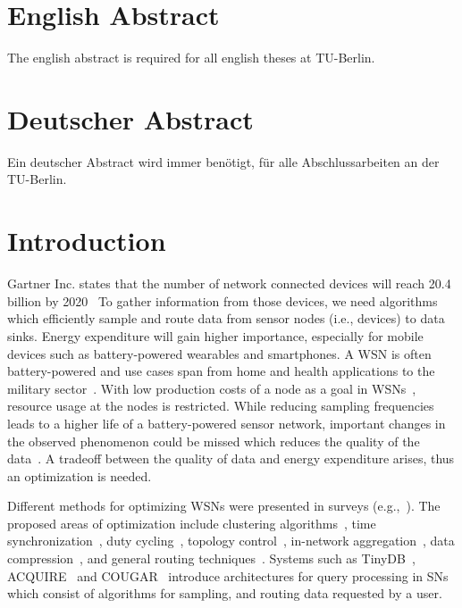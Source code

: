 
\section*{English Abstract}
\begin{onehalfspace}
	
	The english abstract is required for all english theses at TU-Berlin.
\end{onehalfspace}
\clearpage

\section*{Deutscher Abstract}
\begin{onehalfspace}
	
	Ein deutscher Abstract wird immer benötigt, für alle Abschlussarbeiten an
	der TU-Berlin. 
\end{onehalfspace}
\clearpage


\section{Introduction}
\label{sec:Introduction}
Gartner Inc. states that the number of network connected devices will reach
20.4 billion by 2020~\cite{gartner} To gather information from those devices,
we need algorithms which efficiently sample and route data from sensor nodes
(i.e., devices) to data sinks. Energy expenditure will gain higher importance,
especially for mobile devices such as battery-powered wearables and
smartphones. A \ac{WSN} is often battery-powered and use cases span from home
and health applications to the military sector~\cite{akyildiz2002wireless}.
With low production costs of a node as a goal in
\acp{WSN}~\cite{akyildiz2002wireless}, resource usage at the nodes is
restricted. While reducing sampling frequencies leads to a higher life of a
battery-powered sensor network, important changes in the observed phenomenon
could be missed which reduces the quality of the
data~\cite{akyildiz2002wireless}. A tradeoff between the quality of data and
energy expenditure arises, thus an optimization is needed. 
\par
Different methods for optimizing \acp{WSN} were presented in surveys
(e.g.,~\cite{abbasi2007survey, sivrikaya2004time, carrano2014survey}). The
proposed areas of optimization include clustering
algorithms~\cite{abbasi2007survey}, time
synchronization~\cite{sivrikaya2004time}, duty
cycling~\cite{carrano2014survey}, topology control~\cite{li2013survey},
in-network aggregation~\cite{fasolo2007network}, data
compression~\cite{srisooksai2012practical}, and general routing
techniques~\cite{al2004routing, kulkarni2011particle, singh2015survey,
rault2014energy}. Systems such as TinyDB~\cite{madden2005tinydb},
ACQUIRE~\cite{sadagopan2003acquire} and COUGAR~\cite{yao2002cougar} introduce
architectures for query processing in \acp{SN} which consist of algorithms for
sampling, and routing data requested by a user.

